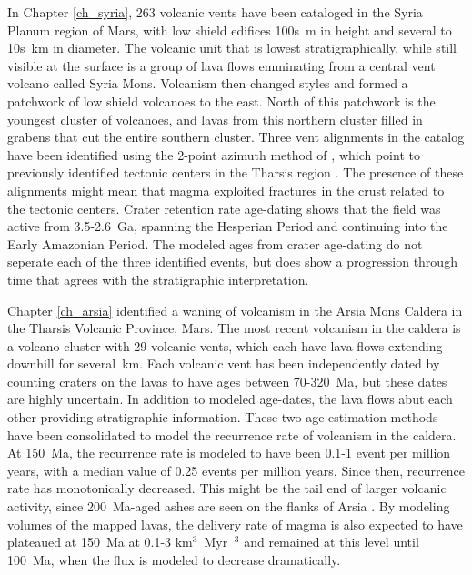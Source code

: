 In Chapter \ref{ch_syria}, 263 volcanic vents have been cataloged in the Syria Planum region of Mars, with low shield edifices 100s~m in height and several to 10s~km in diameter. The volcanic unit that is lowest stratigraphically, while still visible at the surface is a group of lava flows emminating from a central vent volcano called Syria Mons. Volcanism then changed styles and formed a patchwork of low shield volcanoes to the east. North of this patchwork is the youngest cluster of volcanoes, and lavas from this northern cluster filled in grabens that cut the entire southern cluster. Three vent alignments in the catalog have been identified using the 2-point azimuth method of \citet{Cebria2011}, which point to previously identified tectonic centers in the Tharsis region \citep{Anderson2004}. The presence of these alignments might mean that magma exploited fractures in the crust related to the tectonic centers. Crater retention rate age-dating shows that the field was active from 3.5-2.6~Ga, spanning the Hesperian Period and continuing into the Early Amazonian Period. The modeled ages from crater age-dating do not seperate each of the three identified events, but does show a progression through time that agrees with the stratigraphic interpretation.

Chapter \ref{ch_arsia} identified a waning of volcanism in the Arsia Mons Caldera in the Tharsis Volcanic Province, Mars. The most recent volcanism in the caldera is a volcano cluster with 29 volcanic vents, which each have lava flows extending downhill for several~km. Each volcanic vent has been independently dated by counting craters on the lavas to have ages between 70-320~Ma, but these dates are highly uncertain. In addition to modeled age-dates, the lava flows abut each other providing stratigraphic information. These two age estimation methods have been consolidated to model the recurrence rate of volcanism in the caldera. At 150~Ma, the recurrence rate is modeled to have been 0.1-1 event per million years, with a median value of 0.25 events per million years. Since then, recurrence rate has monotonically decreased. This might be the tail end of larger volcanic activity, since 200~Ma-aged ashes are seen on the flanks of Arsia \citep{kadish2014middle}. By modeling volumes of the mapped lavas, the delivery rate of magma is also expected to have plateaued at 150~Ma at 0.1-3 km$^3$~Myr$^{-3}$ and remained at this level until 100~Ma, when the flux is modeled to decrease dramatically.

